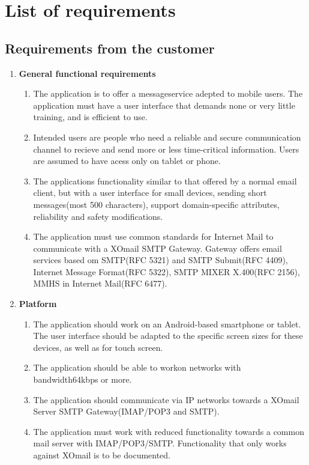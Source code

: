\chapter{List of requirements}

\section{Requirements from the customer}

\begin{enumerate}
\item{} \textbf{General functional requirements}
\begin{enumerate}
\item{}The application is to offer a messageservice adepted to mobile users. The application must have a user interface that demands none or very little training, and is efficient to use.
\item{}Intended users are people who need a reliable and secure communication channel to recieve and send more or less time-critical information. Users are assumed to have acess only on tablet or phone.
\item{}The applications functionality similar to that offered by a normal email client, but with a user interface for small devices, sending short messages(most 500 characters), support domain-specific attributes, reliability and safety modifications.
\item{}The application must use common standards for Internet Mail to communicate with a XOmail SMTP Gateway. Gateway offers email services based om SMTP(RFC 5321) and SMTP Submit(RFC 4409), Internet Message Format(RFC 5322), SMTP MIXER X.400(RFC 2156), MMHS in Internet Mail(RFC 6477).
\end{enumerate}
\item{}\textbf{Platform}
\begin{enumerate}
\item{}The application should work on an Android-based smartphone or tablet. The user interface should be adapted to the specific screen sizes for these devices, as well as for touch screen.
\item{}The application should be able to workon networks with bandwidth64kbps or more.
\item{}The application should communicate via IP networks towards a XOmail Server SMTP Gateway(IMAP/POP3 and SMTP).
\item{}The application must work with reduced functionality towards a common mail server with IMAP/POP3/SMTP. Functionality that only works against XOmail is to be documented.

\end{enumerate}
\end{enumerate}
